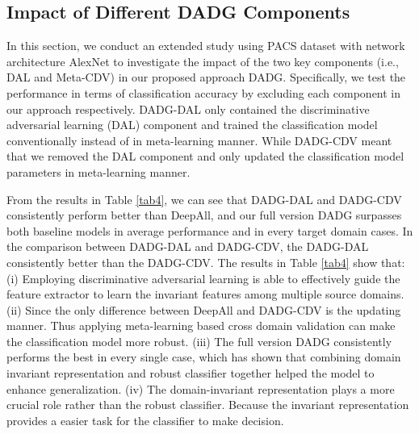 \documentclass[twocolumn,preprint]{elsarticle}
\begin{document}
\subsection{Impact of Different DADG Components} \label{section:impact_dif_comp}
In this section, we conduct an extended study using PACS dataset with network architecture AlexNet to investigate the impact of the two key components (i.e., DAL and Meta-CDV) in our proposed approach DADG. Specifically, we test the performance in terms of classification accuracy by excluding each component in our approach respectively. DADG-DAL only contained the discriminative adversarial learning (DAL) component and trained the classification model conventionally instead of in meta-learning manner. While DADG-CDV meant that we removed the DAL component and only updated the classification model parameters in meta-learning manner. 

From the results in Table \ref{tab4}, we can see that DADG-DAL and DADG-CDV consistently perform better than DeepAll, and our full version DADG surpasses both baseline models in average performance and in every target domain cases. In the comparison between DADG-DAL and DADG-CDV, the DADG-DAL consistently better than the DADG-CDV.
The results in Table \ref{tab4} show that: 
(i) Employing discriminative adversarial learning is able to effectively guide the feature extractor to learn the invariant features among multiple source domains.
(ii) Since the only difference between DeepAll and DADG-CDV is the updating manner. Thus applying meta-learning based cross domain validation can make the classification model more robust.
(iii) The full version DADG consistently performs the best in every single case, which has shown that combining domain invariant representation and robust classifier together helped the model to enhance generalization. 
(iv) The domain-invariant representation plays a more crucial role rather than the robust classifier. Because the invariant representation provides a easier task for the classifier to make decision. 
\end{document}
